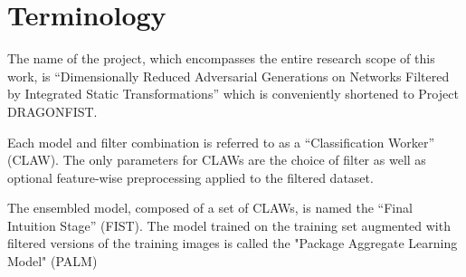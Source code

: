 \section{Terminology} \label{s:terminology}
The name of the project, which encompasses the entire research scope of this work, is ``Dimensionally Reduced Adversarial Generations on Networks Filtered by Integrated Static Transformations'' which is conveniently shortened to Project DRAGONFIST.

Each model and filter combination is referred to as a ``Classification Worker'' (CLAW). The only parameters for CLAWs are the choice of filter as well as optional feature-wise preprocessing applied to the filtered dataset.

The ensembled model, composed of a set of CLAWs, is named the ``Final Intuition Stage'' (FIST). The model trained on the training set augmented with filtered versions of the training images is called the "Package Aggregate Learning Model" (PALM)
